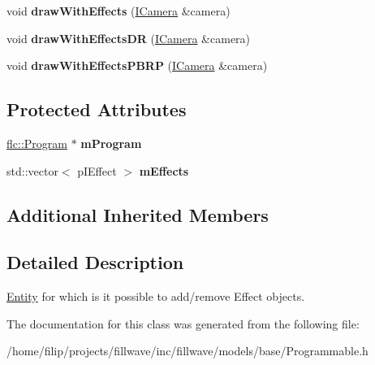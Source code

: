 \begin{DoxyCompactItemize}
void {\bfseries draw\+With\+Effects} (\hyperlink{classflw_1_1flf_1_1ICamera}{I\+Camera} \&camera)
\item 
\mbox{\label{classflw_1_1flf_1_1Programmable_aed374df6b76281b34242eb07989928e1}} 
void {\bfseries draw\+With\+Effects\+DR} (\hyperlink{classflw_1_1flf_1_1ICamera}{I\+Camera} \&camera)
\item 
\mbox{\label{classflw_1_1flf_1_1Programmable_afa8791efd275db35a705676140b1449d}} 
void {\bfseries draw\+With\+Effects\+P\+B\+RP} (\hyperlink{classflw_1_1flf_1_1ICamera}{I\+Camera} \&camera)
\end{DoxyCompactItemize}
\subsection*{Protected Attributes}
\begin{DoxyCompactItemize}
\item 
\mbox{\label{classflw_1_1flf_1_1Programmable_af07ba7892fa638885dc4faab7f020f96}} 
\hyperlink{classflw_1_1flc_1_1Program}{flc\+::\+Program} $\ast$ {\bfseries m\+Program}
\item 
\mbox{\label{classflw_1_1flf_1_1Programmable_ad5e862d4f5edd026874ad70d1f32b9b3}} 
std\+::vector$<$ p\+I\+Effect $>$ {\bfseries m\+Effects}
\end{DoxyCompactItemize}
\subsection*{Additional Inherited Members}


\subsection{Detailed Description}
\hyperlink{classflw_1_1flf_1_1Entity}{Entity} for which is it possible to add/remove Effect objects. 

The documentation for this class was generated from the following file\+:\begin{DoxyCompactItemize}
\item 
/home/filip/projects/fillwave/inc/fillwave/models/base/Programmable.\+h\end{DoxyCompactItemize}
